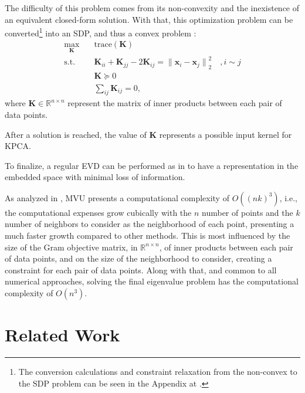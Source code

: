             The difficulty of this problem comes from its non-convexity and the inexistence of an equivalent closed-form solution. With that, this optimization problem can be converted\footnote{The conversion calculations and constraint relaxation from the non-convex to the \ac{SDP} problem can be seen in the Appendix at .} into an \ac{SDP}, and thus a convex problem \cite{mvu}:
            \begin{align}
                \max_{\boldsymbol{K}} \quad & \text{trace}(\boldsymbol{K}) \\
                \textrm{s.t.} \quad 
                    & \boldsymbol{K}_{ii} + \boldsymbol{K}_{jj} -2\boldsymbol{K}_{ij} = {\| \boldsymbol{x}_i - \boldsymbol{x}_j \|}_2^2 \quad , i \sim j \\
                    & \boldsymbol{K} \succeq 0 \\
                    & \sum_{ij} \boldsymbol{K}_{ij} = 0,
            \end{align}
            where  $\boldsymbol{K}\in\mathbb{R}^{n\times n}$ represent the matrix of inner products between each pair of data points.

            After a solution is reached, the value of $\boldsymbol{K}$ represents a possible input kernel for \ac{KPCA}.

            To finalize, a regular \ac{EVD} can be performed as in  to have a representation in the embedded space with minimal loss of information.

            As analyzed in \cite{cube}, \ac{MVU} presents a computational complexity of $O((nk)^3)$, i.e., the computational expenses grow cubically with the $n$ number of points and the $k$ number of neighbors to consider as the neighborhood of each point, presenting a much faster growth compared to other methods. This is most influenced by the size of the Gram objective matrix, in $\mathbb{R}^{n\times n}$, of inner products between each pair of data points, and on the size of the neighborhood to consider, creating a constraint for each pair of data points. Along with that, and common to all numerical approaches, solving the final eigenvalue problem has the computational complexity of $O(n^3)$. %


\section{Related Work}

